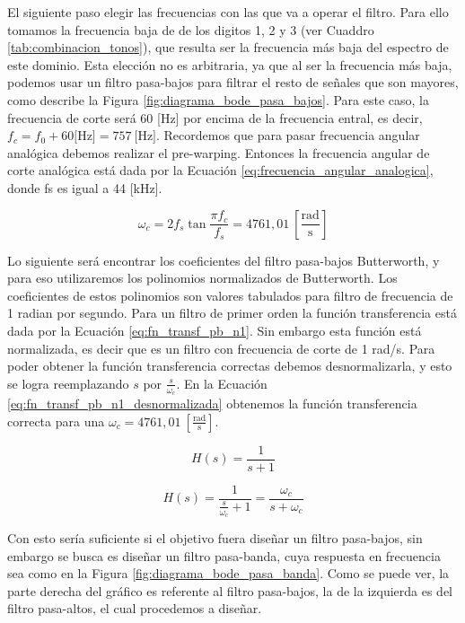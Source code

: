 El siguiente paso elegir las frecuencias con las que va a operar el filtro. Para ello tomamos la frecuencia baja de de los digitos 1, 2 y 3 (ver Cuaddro \ref{tab:combinacion_tonos}), que resulta ser la frecuencia más baja del espectro de este dominio. Esta elección no es arbitraria, ya que al ser la frecuencia más baja, podemos usar un filtro pasa-bajos para filtrar el resto de señales que son mayores, como describe la Figura \ref{fig:diagrama_bode_pasa_bajos}. Para este caso, la frecuencia de corte será 60 [Hz] por encima de la frecuencia entral, es decir, $f_c=f_0+60\textrm{[Hz]}=757\ \textrm{[Hz]}$. Recordemos que para pasar frecuencia angular analógica debemos realizar el pre-warping. Entonces la frecuencia angular de corte analógica está dada por la Ecuación \ref{eq:frecuencia_angular_analogica}, donde \gls{fs} es igual a 44 [kHz].

\begin{equation}
  \omega_{c} = 2 f_s \tan \frac{\pi f_c}{f_s} = 4761,01\ \mathrm{\left[\frac{rad}{s}\right]}
  \label{eq:frecuencia_angular_analogica}
\end{equation}


Lo siguiente será encontrar los coeficientes del filtro pasa-bajos Butterworth, y para eso utilizaremos los polinomios normalizados de Butterworth. Los coeficientes de estos polinomios son valores tabulados para filtro de frecuencia de 1 radian por segundo. Para un filtro de primer orden la función transferencia está dada por la Ecuación \ref{eq:fn_transf_pb_n1}. Sin embargo esta función está normalizada, es decir que es un filtro con frecuencia de corte de 1 rad/s. Para poder obtener la función transferencia correctas debemos desnormalizarla, y esto se logra reemplazando $s$ por $\frac{s}{\omega_c}$. En la Ecuación \ref{eq:fn_transf_pb_n1_desnormalizada} obtenemos la función transferencia correcta para una $\omega_c = 4761,01\ \mathrm{\left[\frac{rad}{s}\right]}$.

\begin{equation}
  H(s) = \frac{1}{s+1}
  \label{eq:fn_transf_pb_n1}
\end{equation}

\begin{equation}
  H(s) = \frac{1}{\frac{s}{\omega_c}+1} = \frac{\omega_c}{s + \omega_c}
  \label{eq:fn_transf_pb_n1_desnormalizada}
\end{equation}

Con esto sería suficiente si el objetivo fuera diseñar un filtro pasa-bajos, sin embargo se busca es diseñar un filtro pasa-banda, cuya respuesta en frecuencia sea como en la Figura \ref{fig:diagrama_bode_pasa_banda}. Como se puede ver, la parte derecha del gráfico es referente al filtro pasa-bajos, la de la izquierda es del filtro pasa-altos, el cual procedemos a diseñar.

